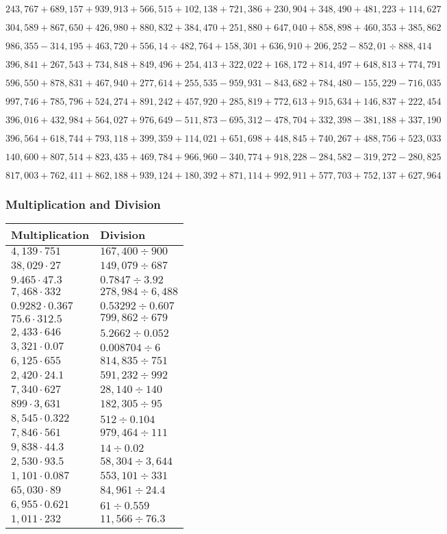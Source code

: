 \(243,767+689,157+939,913+566,515+102,138+721,386+230,904+348,490+481,223+ 114,627\)

\(304,589+867,650+426,980+880,832+384,470+251,880+647,040+858,898+460,353+385,862\)

\(986,355-314,195+463,720+556,14÷482,764+158,301+636,910+206,252-852,01÷888,414\)

\(396,841+267,543+734,848+849,496+254,413+322,022+168,172+814,497+648,813+774,791\)

\(596,550+878,831+467,940+277,614+255,535-959,931-843,682+784,480-155,229-716,035\)

\(997,746+785,796+524,274+891,242+457,920+285,819+772,613+915,634+146,837+222,454\)

\(396,016+432,984+564,027+976,649-511,873-695,312-478,704+332,398-381,188+337,190\)

\(396,564+618,744+793,118+399,359+114,021+651,698+448,845+740,267+488,756+523,033\)

\(140,600+807,514+823,435+469,784+966,960-340,774+918,228-284,582-319,272-280,825\)

\(817,003+762,411+862,188+939,124+180,392+871,114+992,911+577,703+752,137+627,964\)

\hypertarget{multiplication-and-division-322}{%
\subsubsection{Multiplication and
Division}\label{multiplication-and-division-322}}

\begin{longtable}[]{@{}ll@{}}
\toprule
Multiplication & Division\tabularnewline
\midrule
\endhead
\(4,139\cdot751\) & \(167,400÷900\)\tabularnewline
\(38,029\cdot27\) & \(149,079÷687\)\tabularnewline
\(9.465\cdot47.3\) & \(0.7847÷3.92\)\tabularnewline
\(7,468\cdot332\) & \(278,984÷6,488\)\tabularnewline
\(0.9282\cdot0.367\) & \(0.53292÷0.607\)\tabularnewline
\(75.6\cdot312.5\) & \(799,862÷679\)\tabularnewline
\(2,433\cdot646\) & \(5.2662÷0.052\)\tabularnewline
\(3,321\cdot0.07\) & \(0.008704÷6\)\tabularnewline
\(6,125\cdot655\) & \(814,835÷751\)\tabularnewline
\(2,420\cdot24.1\) & \(591,232÷992\)\tabularnewline
\(7,340\cdot627\) & \(28,140÷140\)\tabularnewline
\(899\cdot3,631\) & \(182,305÷95\)\tabularnewline
\(8,545\cdot0.322\) & \(512÷0.104\)\tabularnewline
\(7,846\cdot561\) & \(979,464÷111\)\tabularnewline
\(9,838\cdot44.3\) & \(14÷0.02\)\tabularnewline
\(2,530\cdot93.5\) & \(58,304÷3,644\)\tabularnewline
\(1,101\cdot0.087\) & \(553,101÷331\)\tabularnewline
\(65,030\cdot89\) & \(84,961÷24.4\)\tabularnewline
\(6,955\cdot0.621\) & \(61÷0.559\)\tabularnewline
\(1,011\cdot232\) & \(11,566÷76.3\)\tabularnewline
\bottomrule
\end{longtable}

